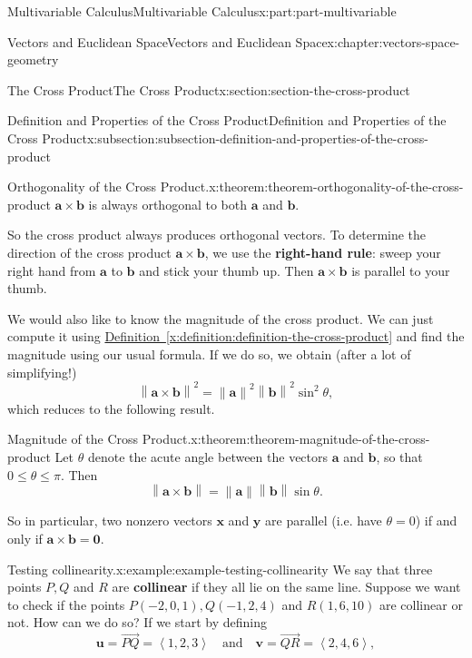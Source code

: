 \documentclass[twoside,10pt,]{book}
\newcommand{\xreffont}{\relax}
\newcommand{\terminology}[1]{\textbf{#1}}
\numberwithin{equation}{part}
\newcommand{\norm}[1]{\left\| #1 \right\|}
\newcommand{\dotprod}[1]{\left\langle #1 \right\rangle}
\begin{document}
\begin{partptx}{Multivariable Calculus}{}{Multivariable Calculus}{}{}{x:part:part-multivariable}
\begin{chapterptx}{Vectors and Euclidean Space}{}{Vectors and Euclidean Space}{}{}{x:chapter:vectors-space-geometry}
\begin{sectionptx}{The Cross Product}{}{The Cross Product}{}{}{x:section:section-the-cross-product}
\begin{subsectionptx}{Definition and Properties of the Cross Product}{}{Definition and Properties of the Cross Product}{}{}{x:subsection:subsection-definition-and-properties-of-the-cross-product}
\begin{theorem}{Orthogonality of the Cross Product.}{}{x:theorem:theorem-orthogonality-of-the-cross-product}
%
\(\mathbf{a}\times\mathbf{b}\) is always orthogonal to both \(\mathbf{a}\) and \(\mathbf{b}\).%
\end{theorem}
So the cross product always produces orthogonal vectors. To determine the direction of the cross product \(\mathbf{a}\times\mathbf{b}\), we use the \terminology{right-hand rule}: sweep your right hand from \(\mathbf{a}\) to \(\mathbf{b}\) and stick your thumb up. Then \(\mathbf{a}\times\mathbf{b}\) is parallel to your thumb.%
\par
We would also like to know the magnitude of the cross product. We can just compute it using \hyperref[x:definition:definition-the-cross-product]{Definition~{\xreffont\ref{x:definition:definition-the-cross-product}}} and find the magnitude using our usual formula. If we do so, we obtain (after a lot of simplifying!)%
%
\begin{equation*}
\norm{\mathbf{a}\times\mathbf{b}}^{2} = \norm{\mathbf{a}}^{2}\norm{\mathbf{b}}^{2}\sin^{2}\theta,
\end{equation*}
which reduces to the following result.%
\begin{theorem}{Magnitude of the Cross Product.}{}{x:theorem:theorem-magnitude-of-the-cross-product}%
%
Let \(\theta\) denote the acute angle between the vectors \(\mathbf{a}\) and \(\mathbf{b}\), so that \(0\leq\theta\leq\pi\). Then%
%
\begin{equation*}
\norm{\mathbf{a}\times\mathbf{b}} = \norm{\mathbf{a}}\norm{\mathbf{b}}\sin\theta.
\end{equation*}
\end{theorem}
So in particular, two nonzero vectors \(\mathbf{x}\) and \(\mathbf{y}\) are parallel (i.e. have \(\theta=0\)) if and only if \(\mathbf{a}\times\mathbf{b} = \mathbf{0}\).%
\begin{example}{Testing collinearity.}{x:example:example-testing-collinearity}%
We say that three points \(P,Q\) and \(R\) are \terminology{collinear} if they all lie on the same line. Suppose we want to check if the points \(P(-2,0,1), Q(-1,2,4)\) and \(R(1,6,10)\) are collinear or not. How can we do so? If we start by defining%
%
\begin{equation*}
\mathbf{u} = \vec{PQ} = \dotprod{1,2,3}\quad\text{and}\quad \mathbf{v} = \vec{QR} = \dotprod{2,4,6},
\end{equation*}

\end{example}
\end{subsectionptx}
\end{sectionptx}
\end{chapterptx}
\end{partptx}
\end{document}
